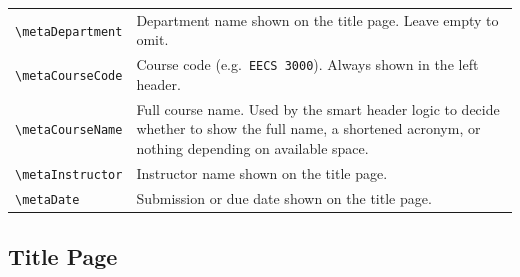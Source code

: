 \begin{tabularx}{\linewidth}{@{}lL@{}}
		\texttt{\textbackslash metaDepartment}      & Department name shown on the title page. Leave empty to omit. \\
		\addlinespace
		
		\texttt{\textbackslash metaCourseCode}      & Course code (e.g.\ \texttt{EECS 3000}). Always shown in the left header. \\
		\addlinespace
		
		\texttt{\textbackslash metaCourseName}      & Full course name. Used by the smart header logic to decide whether to show the full name, a shortened acronym, or nothing depending on available space. \\
		\addlinespace
		
		\texttt{\textbackslash metaInstructor}      & Instructor name shown on the title page. \\
		\addlinespace
		
		\texttt{\textbackslash metaDate}            & Submission or due date shown on the title page. \\
	\end{tabularx}
	
	\subsection{Title Page}
	
